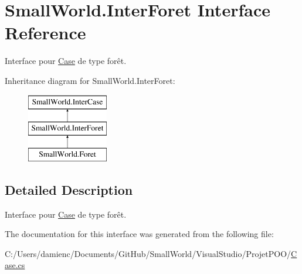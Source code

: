 \hypertarget{interface_small_world_1_1_inter_foret}{\section{Small\-World.\-Inter\-Foret Interface Reference}
\label{interface_small_world_1_1_inter_foret}
}


Interface pour \hyperlink{class_small_world_1_1_case}{Case} de type forêt.  


Inheritance diagram for Small\-World.\-Inter\-Foret\-:\begin{figure}[H]
\begin{center}
\leavevmode
\includegraphics[height=3.000000cm]{interface_small_world_1_1_inter_foret}
\end{center}
\end{figure}


\subsection{Detailed Description}
Interface pour \hyperlink{class_small_world_1_1_case}{Case} de type forêt. 

The documentation for this interface was generated from the following file\-:\begin{DoxyCompactItemize}
\item 
C\-:/\-Users/damienc/\-Documents/\-Git\-Hub/\-Small\-World/\-Visual\-Studio/\-Projet\-P\-O\-O/\hyperlink{_case_8cs}{Case.\-cs}\end{DoxyCompactItemize}
